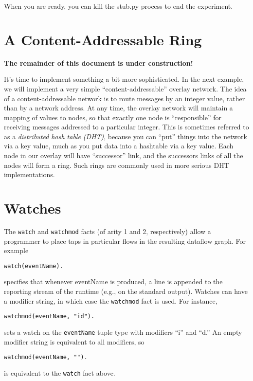 \documentclass{article}
\begin{document}
When you are ready, you can kill the stub.py process to end the
experiment.

\section{A Content-Addressable Ring}
{\bf The remainder of this document is under construction!}

It's time to implement something a bit more sophisticated.  In the
next example, we will implement a very simple ``content-addressable''
overlay network.  The idea of a content-addressable network is to
route messages by an integer value, rather than by a network address.
At any time, the overlay network will maintain a mapping of values to
nodes, so that exactly one node is ``responsible'' for receiving
messages addressed to a particular integer.  This is sometimes
referred to as a {\em distributed hash table (DHT)}, because you can
``put'' things into the network via a key value, much as you put data
into a hashtable via a key value.  Each node in our overlay will have
``successor'' link, and the successors links of all the nodes will
form a ring.  Such rings are commonly used in more serious DHT
implementations.

\section{Watches}

The \lstinline$watch$ and \lstinline$watchmod$ facts (of arity 1 and 2,
respectively) allow a programmer to place taps in
particular flows in the resulting dataflow graph.  For example 
\begin{lstlisting}
watch(eventName).
\end{lstlisting}
specifies that whenever eventName is produced, a line is appended to the
reporting stream of the runtime (e.g., on the standard output).  Watches
can have a modifier string, in which case the \lstinline$watchmod$ fact
is used.  For instance,
\begin{lstlisting}
watchmod(eventName, "id").
\end{lstlisting}
sets a watch on the \lstinline$eventName$ tuple type with modifiers
``i'' and ``d.''  An empty modifier string is equivalent to all
modifiers, so 
\begin{lstlisting}
watchmod(eventName, "").
\end{lstlisting}
is equivalent to the \lstinline$watch$ fact above.
\end{document}
